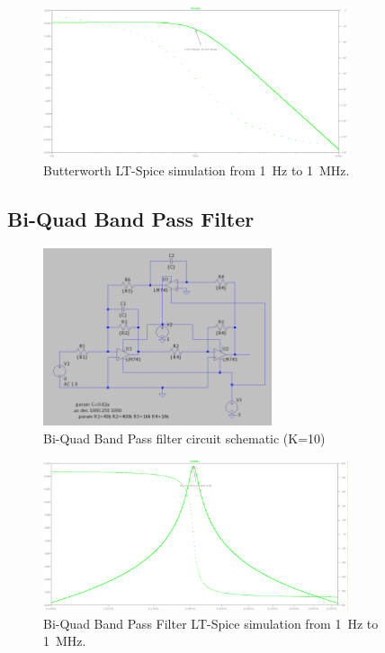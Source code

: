 \documentclass[CMPE]{../KGCOEReport}
\begin{document}
	\begin{figure}[ht]
		\centering
		\includegraphics[width=0.8\textwidth]{butterworth}
		\caption{Butterworth LT-Spice simulation from \SI{1}{\Hz} to \SI{1}{\mega\Hz}.}
		\label{fig:butterworth}
	\end{figure}

	\pagebreak

	\subsection*{Bi-Quad Band Pass Filter}
	\begin{figure}[ht]
		\centering
		\includegraphics[width=0.6\textwidth]{band_pass_schem}
		\caption{Bi-Quad Band Pass filter circuit schematic (K=10)}
		\label{fig:band_pass_shem}
	\end{figure}

	\begin{figure}[ht]
		\centering
		\includegraphics[width=0.8\textwidth]{band_pass}
		\caption{Bi-Quad Band Pass Filter LT-Spice simulation from \SI{1}{\Hz} to \SI{1}{\mega\Hz}.}
		\label{fig:band_pass}
	\end{figure}
\end{document}
